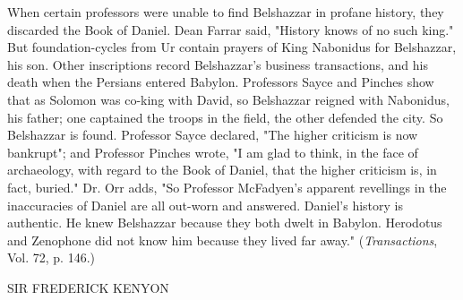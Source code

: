 When certain professors were unable to find Belshazzar in profane history, they discarded the
Book of Daniel. Dean Farrar said, "History knows of no such king." But foundation-cycles
from Ur contain prayers of King Nabonidus for Belshazzar, his son. Other inscriptions record
Belshazzar's business transactions, and his death when the Persians entered Babylon.
Professors Sayce and Pinches show that as Solomon was co-king with David, so Belshazzar
reigned with Nabonidus, his father; one captained the troops in the field, the other defended
the city. So Belshazzar is found. Professor Sayce declared, "The higher criticism is now
bankrupt"; and Professor Pinches wrote, "I am glad to think, in the face of archaeology, with
regard to the Book of Daniel, that the higher criticism is, in fact, buried." Dr. Orr adds, "So
Professor McFadyen's apparent revellings in the inaccuracies of Daniel are all out-worn and
answered. Daniel's history is authentic. He knew Belshazzar because they both dwelt in
Babylon. Herodotus and Zenophone did not know him because they lived far away."
(\textit{Transactions}, Vol. 72, p. 146.)

SIR FREDERICK KENYON

